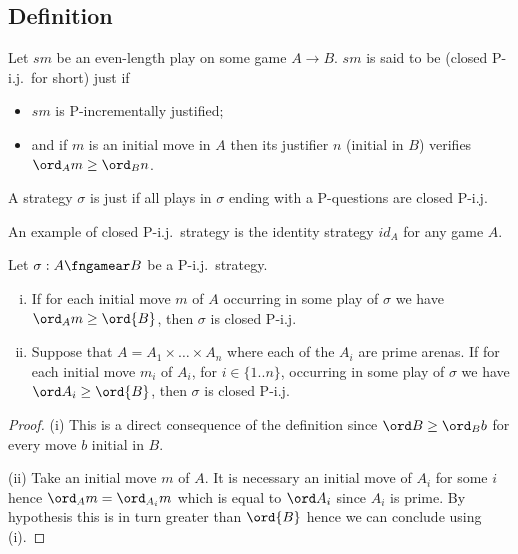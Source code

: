 \subsection{Definition}

\begin{definition}
\label{def:closedpij} Let $s m$ be an even-length play on some game
$A \rightarrow B$. $s m$ is said to be
 (closed P-i.j.\ for short)
just if
\begin{itemize}
\item $s m$ is P-incrementally justified;
\item and if $m$ is an initial move in $A$ then its justifier $n$ (initial in
$B$) verifies $\ord_A m \geq \ord_B n$.
\end{itemize}

\noindent A strategy $\sigma$ is  just if all
plays in $\sigma$ ending with a P-questions are closed P-i.j.
\end{definition}
An example of closed P-i.j.\ strategy is the identity strategy $id_A$
for any game $A$.

\begin{lemma}
\label{lem:closedpij_singleBinitmove} Let $\sigma : A \fngamear B$ be a P-i.j.\ strategy.
\begin{enumerate}[i.]
\item If for each initial move $m$ of $A$ occurring in some play of $\sigma$ we have $\ord_A m \geq \ord{B}$, then $\sigma$ is closed P-i.j.
\item Suppose that $A=A_1\times \ldots \times A_n$ where each of the $A_i$ are prime arenas. If for each initial move $m_i$ of $A_i$, for $i \in \{1..n\}$, occurring in some play of $\sigma$ we have $\ord A_i \geq \ord{B}$, then $\sigma$ is closed P-i.j.
\end{enumerate}
\end{lemma}
\begin{proof}
(i) This is a direct consequence of the definition since $\ord B \geq \ord_B b$ for every move $b$ initial in $B$.

(ii) Take an initial move $m$ of $A$. It is necessary an initial move of $A_i$ for some $i$ hence $\ord_A m = \ord_{A_i} m$ which is equal to $\ord A_i$ since $A_i$ is prime. By hypothesis this is in turn greater than $\ord{B}$ hence we can conclude using (i).
\end{proof}



